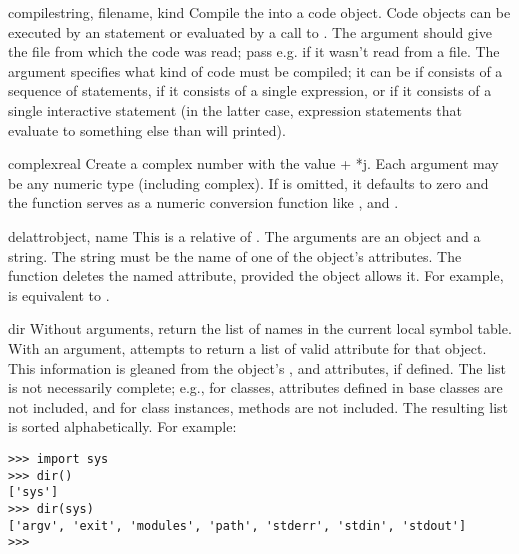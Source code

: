 \begin{funcdesc}{compile}{string, filename, kind}
  Compile the  into a code object.  Code objects can be
  executed by an  statement or evaluated by a call to
  .  The  argument should
  give the file from which the code was read; pass e.g. 
  if it wasn't read from a file.  The  argument specifies
  what kind of code must be compiled; it can be  if
   consists of a sequence of statements, 
  if it consists of a single expression, or  if
  it consists of a single interactive statement (in the latter case,
  expression statements that evaluate to something else than
   will printed).
\end{funcdesc}

\begin{funcdesc}{complex}{real}
  Create a complex number with the value  + *j.
  Each argument may be any numeric type (including complex).
  If  is omitted, it defaults to zero and the function
  serves as a numeric conversion function like ,
   and .
\end{funcdesc}

\begin{funcdesc}{delattr}{object, name}
  This is a relative of .  The arguments are an
  object and a string.  The string must be the name
  of one of the object's attributes.  The function deletes
  the named attribute, provided the object allows it.  For example,
   is equivalent to
  .
\end{funcdesc}

\begin{funcdesc}{dir}{}
  Without arguments, return the list of names in the current local
  symbol table.  With an argument, attempts to return a list of valid
  attribute for that object.  This information is gleaned from the
  object's ,  and 
  attributes, if defined.  The list is not necessarily complete; e.g.,
  for classes, attributes defined in base classes are not included,
  and for class instances, methods are not included.
  The resulting list is sorted alphabetically.  For example:

\begin{verbatim}
>>> import sys
>>> dir()
['sys']
>>> dir(sys)
['argv', 'exit', 'modules', 'path', 'stderr', 'stdin', 'stdout']
>>> 
\end{verbatim}
\end{funcdesc}

